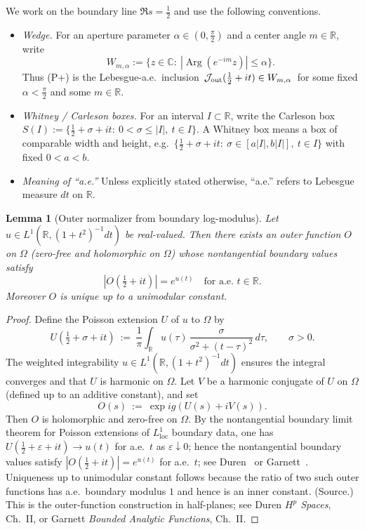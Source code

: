 \documentclass[11pt]{amsart}
\newtheorem{lemma}[theorem]{Lemma}
\theoremstyle{definition}
\theoremstyle{remark}
\DeclareMathOperator{\Arg}{Arg}
\begin{document}
We work on the boundary line $\Re s=\tfrac12$ and use the following conventions.
\begin{itemize}
\item \emph{Wedge.} For an aperture parameter $\alpha\in(0,\tfrac\pi2)$ and a center angle $m\in\mathbb R$, write
\[
  W_{m,\alpha}:=\{z\in\mathbb C:\ |\Arg(e^{-im}z)|\le \alpha\}.
\]
Thus \textup{(P+)} is the Lebesgue-a.e.\ inclusion $\,\mathcal J_{\rm out}(\tfrac12+it)\in W_{m,\alpha}\,$ for some fixed $\alpha<\tfrac\pi2$
and some $m\in\mathbb R$.

\item \emph{Whitney / Carleson boxes.} For an interval $I\subset\mathbb R$, write the Carleson box
$S(I):=\{\tfrac12+\sigma+it:\ 0<\sigma\le |I|,\ t\in I\}$.
A Whitney box means a box of comparable width and height, e.g.\ $\{\tfrac12+\sigma+it:\ \sigma\in[a|I|,b|I|],\ t\in I\}$ with fixed $0<a<b$.

\item \emph{Meaning of ``a.e.''} Unless explicitly stated otherwise, ``a.e.'' refers to Lebesgue measure $dt$ on $\mathbb R$.
\end{itemize}
\begin{lemma}[Outer normalizer from boundary log-modulus]
\label{lem:outer-from-logmodulus}
Let $u\in L^1(\mathbb R,(1+t^2)^{-1}dt)$ be real-valued. Then there exists an outer function $O$ on $\Omega$
(zero-free and holomorphic on $\Omega$) whose nontangential boundary values satisfy
\[
|O(\tfrac12+it)| = e^{u(t)} \quad\text{for a.e. }t\in\mathbb R.
\]
Moreover $O$ is unique up to a unimodular constant.
\end{lemma}
\begin{proof}
Define the Poisson extension $U$ of $u$ to $\Omega$ by
\[
U(\tfrac12+\sigma+it)\ :=\ \frac{1}{\pi}\int_{\mathbb R} u(\tau)\,\frac{\sigma}{\sigma^2+(t-\tau)^2}\,d\tau,
\qquad \sigma>0.
\]
The weighted integrability $u\in L^1(\mathbb R,(1+t^2)^{-1}dt)$ ensures the integral converges and that $U$ is harmonic on $\Omega$.
Let $V$ be a harmonic conjugate of $U$ on $\Omega$ (defined up to an additive constant), and set
\[
O(s)\ :=\ \exp\!ig(U(s)+iV(s)).
\]
Then $O$ is holomorphic and zero-free on $\Omega$. By the nontangential boundary limit theorem for Poisson extensions of $L^1_{\mathrm{loc}}$ boundary data, one has $U(\tfrac12+\varepsilon+it)\to u(t)$ for a.e.\ $t$ as $\varepsilon\downarrow 0$; hence the nontangential boundary values satisfy $|O(\tfrac12+it)|=e^{u(t)}$ for a.e.\ $t$; see Duren~\cite[Ch.~II]{DurenHp} or Garnett~\cite[Ch.~II]{GarnettBAF}.
Uniqueness up to unimodular constant follows because the ratio of two such outer functions has a.e.\ boundary modulus $1$ and hence is an inner constant.
(Source.) This is the outer-function construction in half-planes; see Duren \emph{$H^p$ Spaces}, Ch.~II, or Garnett \emph{Bounded Analytic Functions}, Ch.~II.
\end{proof}
\end{document}
